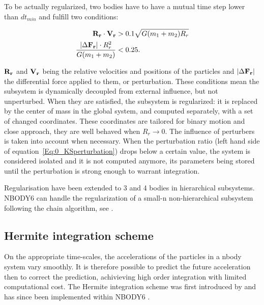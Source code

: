 To be actually regularized, two bodies have to have a mutual time step lower than $dt_{min}$ and fulfill two conditions:

\begin{align}
\bold{R_r} \cdot \bold{V_r} &> 0.1 \sqrt{ G(m_1+m_2)R_r}\\
\label{Eq:0_KSperturbation}
\frac{\left| \Delta \bold{F_r} \right| \cdot R^2_r}{G(m_1+m_2)} &< 0.25.
\end{align}

$\bold{R_r}$ and $\bold{V_r}$ being the relative velocities and positions of the particles and $\left| \Delta \bold{F_r} \right|$ the differential force applied to them, or perturbation. These conditions mean the subsystem is dynamically decoupled from external influence, but not unperturbed. When they are satisfied, the subsystem is regularized: it is replaced by the center of mass in the global system, and computed separately, with a set of changed coordinates. These coordinates are tailored for binary motion and close approach, they are well behaved when $R_r \rightarrow 0$. The influence of perturbers is taken into account when necessary. When the perturbation ratio (left hand side of equation~\ref{Eq:0_KSperturbation}) drops below a certain value, the system is considered isolated and it is not computed anymore, its parameters being stored until the perturbation is strong enough to warrant integration.

Regularisation have been extended to 3 and 4 bodies in hierarchical subsystems. NBODY6 can handle the regularization of a small-n non-hierarchical subsystem following the chain algorithm, see \cite{Mikkola1993}.


\subsection{Hermite integration scheme}

On the appropriate time-scales, the accelerations of the particles in a nbody system vary smoothly. It is therefore possible to predict the future acceleration then to correct the prediction, achivieving high order integration with limited computational cost. The Hermite integration scheme was first  introduced by \cite{Makino1991} and has since been implemented within NBODY6 \citep{Aarseth2003}.


